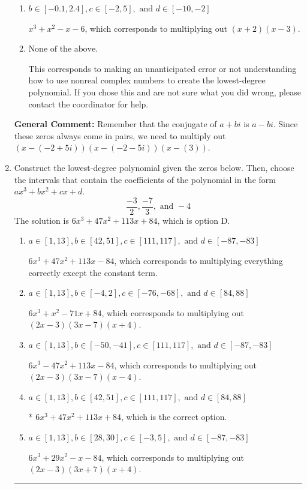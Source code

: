 \documentclass{extbook}[14pt]
\newcommand{\litem}[1]{\item #1

\rule{\textwidth}{0.4pt}}
\begin{document}
\begin{enumerate}
{\begin{enumerate}[label=\Alph*.]
$x^{3} + x^{2} -8 x + 15$, which corresponds to multiplying out $(x -5)(x -3)$.
\item \( b \in [-0.1, 2.4], c \in [-2, 5], \text{ and } d \in [-10, -2] \)

$x^{3} + x^{2} -x -6$, which corresponds to multiplying out $(x + 2)(x -3)$.
\item \( \text{None of the above.} \)

This corresponds to making an unanticipated error or not understanding how to use nonreal complex numbers to create the lowest-degree polynomial. If you chose this and are not sure what you did wrong, please contact the coordinator for help.
\end{enumerate}

\textbf{General Comment:} Remember that the conjugate of $a+bi$ is $a-bi$. Since these zeros always come in pairs, we need to multiply out $(x-(-2 + 5 i))(x-(-2 - 5 i))(x-(3))$.
}
\litem{
Construct the lowest-degree polynomial given the zeros below. Then, choose the intervals that contain the coefficients of the polynomial in the form $ax^3+bx^2+cx+d$.
\[ \frac{-3}{2}, \frac{-7}{3}, \text{ and } -4 \]The solution is \( 6x^{3} +47 x^{2} +113 x + 84 \), which is option D.\begin{enumerate}[label=\Alph*.]
\item \( a \in [1, 13], b \in [42, 51], c \in [111, 117], \text{ and } d \in [-87, -83] \)

$6x^{3} +47 x^{2} +113 x -84$, which corresponds to multiplying everything correctly except the constant term.
\item \( a \in [1, 13], b \in [-4, 2], c \in [-76, -68], \text{ and } d \in [84, 88] \)

$6x^{3} + x^{2} -71 x + 84$, which corresponds to multiplying out $(2x -3)(3x -7)(x + 4)$.
\item \( a \in [1, 13], b \in [-50, -41], c \in [111, 117], \text{ and } d \in [-87, -83] \)

$6x^{3} -47 x^{2} +113 x -84$, which corresponds to multiplying out $(2x -3)(3x -7)(x -4)$.
\item \( a \in [1, 13], b \in [42, 51], c \in [111, 117], \text{ and } d \in [84, 88] \)

* $6x^{3} +47 x^{2} +113 x + 84$, which is the correct option.
\item \( a \in [1, 13], b \in [28, 30], c \in [-3, 5], \text{ and } d \in [-87, -83] \)

$6x^{3} +29 x^{2} -x -84$, which corresponds to multiplying out $(2x -3)(3x + 7)(x + 4)$.
\end{enumerate}

}
\end{enumerate}
\end{document}

